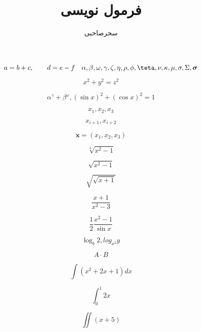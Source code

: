\documentclass{article}
\title{فرمول نویسی}
\author{سحرصاحبی}
\begin{document}
\maketitle	
	
\[
a=b+c,
\qquad
 d=e-f
 \quad

  \alpha,\beta , \omega,\gamma,\zeta ,\eta,\rho,\phi,\teta,\nu,\kappa,\mu,\sigma , \Sigma , \boldsymbol{\sigma}
\]	

\[
x^{2}+y^{2}=z^{2}
\]	

\[
\alpha^\gamma+\beta^\omega, (\sin x)^{2} +(\cos x)^{2}=1
\]

\[
x_1,x_2,x_3
\]

\[
x_{i+1}, x_{i+2}
\]
	
\[
\mathbf{x}=(x_1,x_2,x_3)
\]	

\[
\sqrt[3]{x^2-1}
\]
	
\[
\sqrt{x^2-1}
\]

\[
\sqrt{\sqrt{x+1}}
\]

\[
\frac{x+1}{x^2-3}
\]

\[
\frac{1}{2}\frac{x^2-1}{\sin x}
\]
	
\[
\log_b 2 , log_{x^2} y
\]

\[
A\cdot B
\]

\[
\int(x^2+2x+1)dx
\]

\[
\int_{0}^{1} 2x
\]

\[
\iint(x+5)
\]
\end{document}
